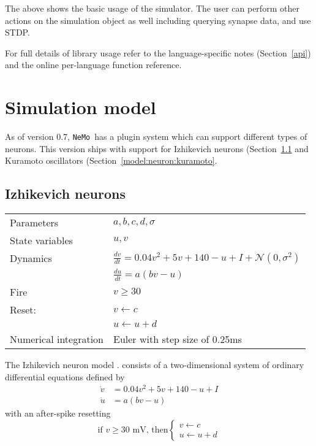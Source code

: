 \documentclass[a4paper]{article}
\newcommand{\nemo}{\texttt{NeMo}}
\begin{document}
The above shows the basic usage of the simulator.
The user can perform other actions on the simulation object as well
	including querying synapse data,
	and use STDP.

For full details of library usage refer to the language-specific notes (Section~\ref{api})
and the online per-language function reference.

\section{Simulation model}
\label{model}

As of version 0.7, \nemo\ has a plugin system which can support different types of neurons.
This version ships with support for 
Izhikevich neurons (Section~\ref{model:neuron:izhikevich} and 
Kuramoto oscillators (Section~\ref{model:neuron:kuramoto}.

\subsection{Izhikevich neurons}
\label{model:neuron:izhikevich}

\begin{tabular}{ll}
Parameters      & $a, b, c, d, \sigma$              \\
State variables & $u, v$                           \\
Dynamics        & $\frac{dv}{dt} = 0.04v^2+5v+140-u+I + \mathcal{N}(0,\sigma^2)$ \\
                & $\frac{du}{dt} = a(bv-u)$        \\ 
Fire            & $v \ge 30$                       \\
Reset:          & $v\leftarrow c$                  \\
                & $u\leftarrow u+d$                \\
Numerical integration & Euler with step size of 0.25ms \\
\end{tabular}

The Izhikevich neuron model 
\cite{izhikevich2003simple_model}.
consists of a two-dimensional system of ordinary differential equations defined by
\begin{align}
	\dot{v} & = 0.04v^2+5v+140-u+I    \label{eq:update_v} \\
	\dot{u} & = a(bv-u)               \label{eq:update_u}
\end{align}
with an after-spike resetting
\begin{equation}
\label{eq:reset}
\text{if }v\ge30\text{ mV, then}\begin{cases}v\leftarrow c\\u\leftarrow u+d\end{cases}
\end{equation}
\end{document}
